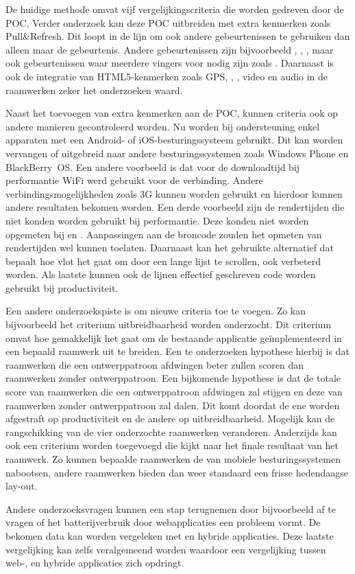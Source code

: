 De huidige methode omvat vijf vergelijkingscriteria die worden gedreven door de POC.
Verder onderzoek kan deze POC uitbreiden met extra kenmerken zoals Pull\&Refresh.
Dit loopt in de lijn om ook andere gebeurtenissen te gebruiken dan alleen maar de  gebeurtenis.
Andere gebeurtenissen zijn bijvoorbeeld , , , maar ook gebeurtenissen waar meerdere vingers voor nodig zijn zoals .
Daarnaast is ook de integratie van HTML5-kenmerken zoals GPS, , , video en audio in de raamwerken zeker het onderzoeken waard.

Naast het toevoegen van extra kenmerken aan de POC, kunnen criteria ook op andere manieren gecontroleerd worden.
Nu worden bij ondersteuning enkel apparaten met een Android- of iOS-besturingssysteem gebruikt.
Dit kan worden vervangen of uitgebreid naar andere besturingssystemen zoals Windows Phone en BlackBerry~OS.
Een andere voorbeeld is dat voor de downloadtijd bij performantie WiFi werd gebruikt voor de verbinding.
Andere verbindingsmogelijkheden zoals 3G kunnen worden gebruikt en hierdoor kunnen andere resultaten bekomen worden.
Een derde voorbeeld zijn de rendertijden die niet konden worden gebruikt bij performantie.
Deze konden niet worden opgemeten bij \st{} en \lungo{}.
Aanpassingen aan de broncode zouden het opmeten van rendertijden wel kunnen toelaten.
Daarnaast kan het gebruikte alternatief dat bepaalt hoe vlot het gaat om door een lange lijst te scrollen, ook verbeterd worden.
Als laatste kunnen ook de lijnen effectief geschreven code worden gebruikt bij productiviteit. 

Een andere onderzoekspiste is om nieuwe criteria toe te voegen.
Zo kan bijvoorbeeld het criterium uitbreidbaarheid worden onderzocht.
Dit criterium omvat hoe gemakkelijk het gaat om de bestaande applicatie geïmplementeerd in een bepaald raamwerk uit te breiden.
Een te onderzoeken hypothese hierbij is dat raamwerken die een ontwerppatroon afdwingen beter zullen scoren dan raamwerken zonder ontwerppatroon.
Een bijkomende hypothese is dat de totale score van raamwerken die een ontwerppatroon afdwingen zal stijgen en deze van raamwerken zonder ontwerppatroon zal dalen.
Dit komt doordat de ene worden afgestraft op productiviteit en de andere op uitbreidbaarheid.
Mogelijk kan de rangschikking van de vier onderzochte raamwerken veranderen.
Anderzijds kan ook een criterium worden toegevoegd die kijkt naar het finale resultaat van het raamwerk.
Zo kunnen bepaalde raamwerken de  van mobiele besturingssystemen  nabootsen, andere raamwerken bieden dan weer standaard een frisse hedendaagse lay-out.

Andere onderzoeksvragen kunnen een stap terugnemen door bijvoorbeeld af te vragen of het batterijverbruik door webapplicaties een probleem vormt.
De bekomen data kan worden vergeleken met  en hybride applicaties.
Deze laatste vergelijking kan zelfs veralgemeend worden waardoor een vergelijking tussen web-,  en hybride applicaties zich opdringt. 


